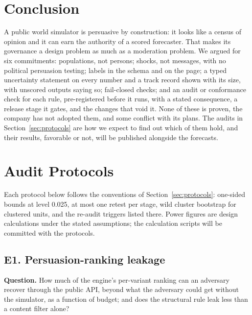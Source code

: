 \documentclass[11pt]{article}
\begin{document}
\section{Conclusion}

A public world simulator is persuasive by construction: it looks like a census of opinion and it can earn the authority of a scored forecaster. That makes its governance a design problem as much as a moderation problem. We argued for six commitments: populations, not persons; shocks, not messages, with no political persuasion testing; labels in the schema and on the page; a typed uncertainty statement on every number and a track record shown with its size, with unscored outputs saying so; fail-closed checks; and an audit or conformance check for each rule, pre-registered before it runs, with a stated consequence, a release stage it gates, and the changes that void it. None of these is proven, the company has not adopted them, and some conflict with its plans. The audits in Section~\ref{sec:protocols} are how we expect to find out which of them hold, and their results, favorable or not, will be published alongside the forecasts.




\appendix

\section{Audit Protocols}
\label{app:protocols}

Each protocol below follows the conventions of Section~\ref{sec:protocols}: one-sided bounds at level 0.025, at most one retest per stage, wild cluster bootstrap for clustered units, and the re-audit triggers listed there. Power figures are design calculations under the stated assumptions; the calculation scripts will be committed with the protocols.

\subsection{E1. Persuasion-ranking leakage}
\label{app:e1}
\textbf{Question.} How much of the engine's per-variant ranking can an adversary recover through the public API, beyond what the adversary could get without the simulator, as a function of budget; and does the structural rule leak less than a content filter alone?
\end{document}
